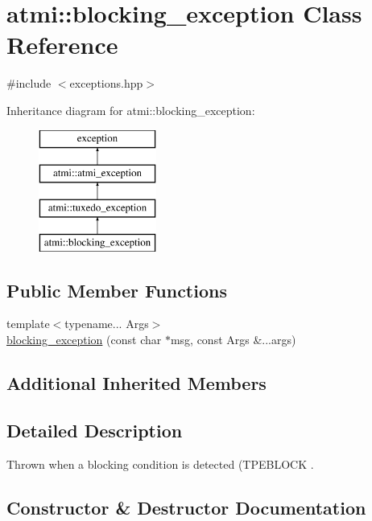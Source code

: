 \hypertarget{classatmi_1_1blocking__exception}{}\section{atmi\+:\+:blocking\+\_\+exception Class Reference}
\label{classatmi_1_1blocking__exception}


{\ttfamily \#include $<$exceptions.\+hpp$>$}

Inheritance diagram for atmi\+:\+:blocking\+\_\+exception\+:\begin{figure}[H]
\begin{center}
\leavevmode
\includegraphics[height=4.000000cm]{classatmi_1_1blocking__exception}
\end{center}
\end{figure}
\subsection*{Public Member Functions}
\begin{DoxyCompactItemize}
\item 
{\footnotesize template$<$typename... Args$>$ }\\\hyperlink{classatmi_1_1blocking__exception_a2237c2b5b3264745e145d0e4e26838ad}{blocking\+\_\+exception} (const char $\ast$msg, const Args \&...args)
\end{DoxyCompactItemize}
\subsection*{Additional Inherited Members}


\subsection{Detailed Description}
Thrown when a blocking condition is detected (T\+P\+E\+B\+L\+O\+C\+K . 

\subsection{Constructor \& Destructor Documentation}
\hypertarget{classatmi_1_1blocking__exception_a2237c2b5b3264745e145d0e4e26838ad}{}
